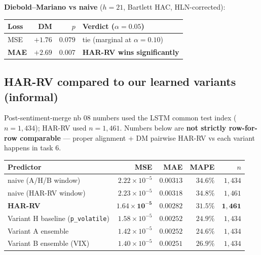 \documentclass[11pt]{article}
\begin{document}
\textbf{Diebold--Mariano vs naive} ($h = 21$, Bartlett HAC, HLN-corrected):

\begin{center}
\renewcommand{\arraystretch}{1.15}
\begin{tabular}{@{}lrrl@{}}
\toprule
Loss & DM & $p$ & Verdict ($\alpha = 0.05$) \\
\midrule
MSE          & $+1.76$ & $0.079$ & tie (marginal at $\alpha = 0.10$) \\
\textbf{MAE} & $\mathbf{+2.69}$ & $\mathbf{0.007}$ & \textbf{HAR-RV wins significantly} \\
\bottomrule
\end{tabular}
\end{center}

\subsection*{HAR-RV compared to our learned variants (informal)}

Post-sentiment-merge nb 08 numbers used the LSTM common test index ($n = 1{,}434$); HAR-RV used $n = 1{,}461$. Numbers below are \textbf{not strictly row-for-row comparable} --- proper alignment + DM pairwise HAR-RV vs each variant happens in task 6.

\begin{center}
\renewcommand{\arraystretch}{1.15}
\begin{tabular}{@{}lrrrr@{}}
\toprule
Predictor & MSE & MAE & MAPE & $n$ \\
\midrule
naive (A/H/B window)               & $2.22 \times 10^{-5}$ & $0.00313$ & $34.6\%$ & $1{,}434$ \\
naive (HAR-RV window)              & $2.23 \times 10^{-5}$ & $0.00318$ & $34.8\%$ & $1{,}461$ \\
\textbf{HAR-RV}                    & $\mathbf{1.64 \times 10^{-5}}$ & $\mathbf{0.00282}$ & $\mathbf{31.5\%}$ & $\mathbf{1{,}461}$ \\
Variant H baseline (\texttt{p\_volatile}) & $1.58 \times 10^{-5}$ & $0.00252$ & $24.9\%$ & $1{,}434$ \\
Variant A ensemble                 & $1.42 \times 10^{-5}$ & $0.00252$ & $24.6\%$ & $1{,}434$ \\
Variant B ensemble (VIX)           & $1.40 \times 10^{-5}$ & $0.00251$ & $26.9\%$ & $1{,}434$ \\
\bottomrule
\end{tabular}
\end{center}
\end{document}
